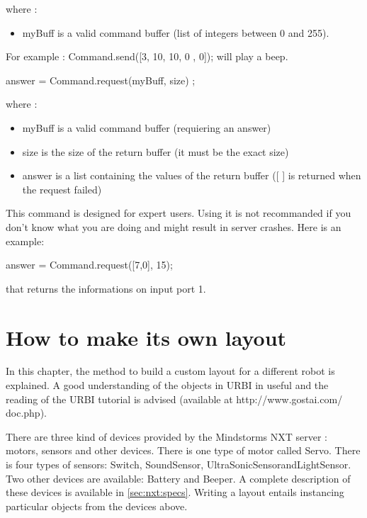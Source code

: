 where :
\begin{itemize}
\item myBuff is a valid command buffer (list of integers between 0 and 255).
\end{itemize}
For example :
  Command.send([3, 10, 10, 0 , 0]);
will play a beep.


\begin{urbiunchecked}
  answer = Command.request(myBuff, size) ;
\end{urbiunchecked}

where :
\begin{itemize}
\item  myBuff is a valid command buffer (requiering an answer)

\item size is the size of the return buffer (it must be the exact size)

\item answer is a list containing the values of the return buffer ([ ] is
  returned when the request failed)
\end{itemize}

This command is designed for expert users. Using it is not recommanded if you
don't know what you are doing and might result in server crashes.
Here is an example:
\begin{urbiunchecked}
  answer = Command.request([7,0], 15);
\end{urbiunchecked}

that returns the informations on input port 1.

\section{How to make its own layout}

In this chapter, the method to build a custom layout for a different robot is
explained. A good understanding of the objects in URBI in useful and the
reading of the URBI tutorial is advised (available at http://www.gostai.com/
doc.php).

There are three kind of devices provided by the Mindstorms NXT server :
motors, sensors and other devices. There is one type of motor called
Servo. There is four types of sensors: Switch, SoundSensor,
UltraSonicSensorandLightSensor. Two other devices are available: Battery and
Beeper. A complete description of these devices is available in
\autoref{sec:nxt:specs}.  Writing a layout entails instancing particular
objects from the devices above.


